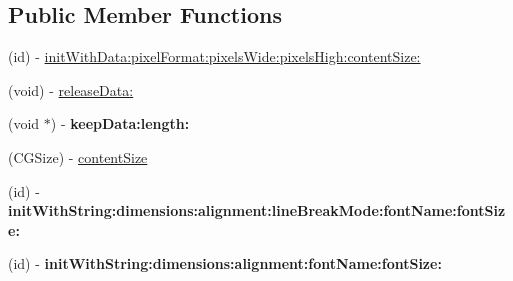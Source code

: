 \subsection*{Public Member Functions}
\begin{DoxyCompactItemize}
\item 
(id) -\/ \hyperlink{class_c_c_texture2_d_a1cd7f026ad78494f067962644aeca13a}{init\-With\-Data\-:pixel\-Format\-:pixels\-Wide\-:pixels\-High\-:content\-Size\-:}
\item 
(void) -\/ \hyperlink{class_c_c_texture2_d_a3858d190fd30a8923bc2df271565c1a6}{release\-Data\-:}
\item 
\hypertarget{class_c_c_texture2_d_af3dd7ce7369eebb76cc67918b2235217}{(void $\ast$) -\/ {\bfseries keep\-Data\-:length\-:}}\label{class_c_c_texture2_d_af3dd7ce7369eebb76cc67918b2235217}

\item 
(C\-G\-Size) -\/ \hyperlink{class_c_c_texture2_d_a3a3c78eba67f918f8991a21c19c0bfce}{content\-Size}
\item 
\hypertarget{class_c_c_texture2_d_af4acbb904feaa0c2fa07d827458431ca}{(id) -\/ {\bfseries init\-With\-String\-:dimensions\-:alignment\-:line\-Break\-Mode\-:font\-Name\-:font\-Size\-:}}\label{class_c_c_texture2_d_af4acbb904feaa0c2fa07d827458431ca}

\item 
\hypertarget{class_c_c_texture2_d_a29bb9e667f78861d9824405f8325f7b2}{(id) -\/ {\bfseries init\-With\-String\-:dimensions\-:alignment\-:font\-Name\-:font\-Size\-:}}\label{class_c_c_texture2_d_a29bb9e667f78861d9824405f8325f7b2}


\end{DoxyCompactItemize}
